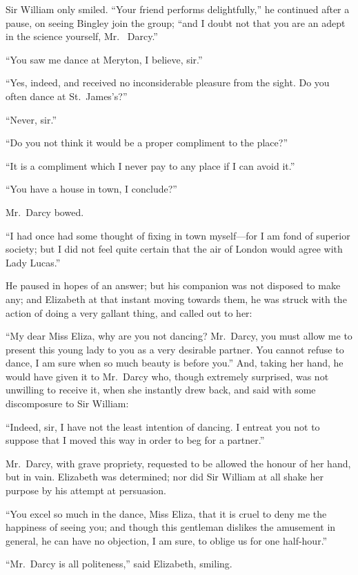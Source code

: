 Sir William only smiled.  ``Your friend performs delightfully,'' he
continued after a pause, on seeing Bingley join the group; ``and I
doubt not that you are an adept in the science yourself, Mr.\ %
Darcy.''

``You saw me dance at Meryton, I believe, sir.''

``Yes, indeed, and received no inconsiderable pleasure from the
sight.  Do you often dance at St.\ James's?''

``Never, sir.''

``Do you not think it would be a proper compliment to the
place?''

``It is a compliment which I never pay to any place if I can
avoid it.''

``You have a house in town, I conclude?''

Mr.\ Darcy bowed.

``I had once had some thought of fixing in town myself---for I am
fond of superior society; but I did not feel quite certain that the
air of London would agree with Lady Lucas.''

He paused in hopes of an answer; but his companion was not
disposed to make any; and Elizabeth at that instant moving
towards them, he was struck with the action of doing a very
gallant thing, and called out to her:

``My dear Miss Eliza, why are you not dancing?  Mr.\ Darcy, you
must allow me to present this young lady to you as a very
desirable partner.  You cannot refuse to dance, I am sure when
so much beauty is before you.''  And, taking her hand, he would
have given it to Mr.\ Darcy who, though extremely surprised,
was not unwilling to receive it, when she instantly drew back,
and said with some discomposure to Sir William:

``Indeed, sir, I have not the least intention of dancing.  I entreat
you not to suppose that I moved this way in order to beg for a
partner.''

Mr.\ Darcy, with grave propriety, requested to be allowed the
honour of her hand, but in vain.  Elizabeth was determined; nor
did Sir William at all shake her purpose by his attempt at
persuasion.

``You excel so much in the dance, Miss Eliza, that it is cruel to
deny me the happiness of seeing you; and though this gentleman
dislikes the amusement in general, he can have no objection, I
am sure, to oblige us for one half-hour.''

``Mr.\ Darcy is all politeness,'' said Elizabeth, smiling.

